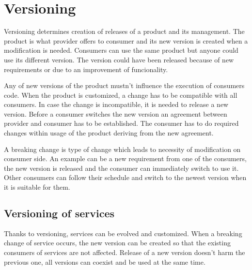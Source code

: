 \chapter{Versioning}
\label{chap:versioning}

Versioning determines creation of releases of a product and its management. The product is what provider offers to consumer and its new version is created when a modification is needed. Consumers can use the same product but anyone could use its different version. The version could have been released because of new requirements or due to an improvement of funcionality. 

Any of new versions of the product mustn't influence the execution of consumers code. When the product is customized, a change has to be compatible with all consumers. In case the change is incompatible, it is needed to release a new version. Before a consumer switches the new version an agreement between provider and consumer has to be established. The consumer has to do required changes within usage of the product deriving from the new agreement.

A breaking change is type of change which leads to necessity of modification on consumer side. An example can be a new requirement from one of the consumers, the new version is released and the consumer can immediately switch to use it. Other consumers can follow their schedule and switch to the newest version when it is suitable for them. 

\section{Versioning of services}
\label{sec:verioningservices}
Thanks to versioning, services can be evolved and customized. When a breaking change of service occurs, the new version can be created so that the existing consumers of services are not affected. Release of a new version doesn't harm the previous one, all versions can coexist and be used at the same time. 

